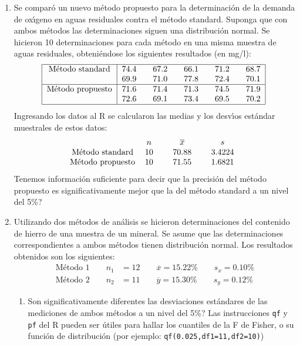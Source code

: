 \documentclass[11pt,a4paper,twoside]{article}%
\begin{document}
\begin{enumerate}
\item Se compar\'{o} un nuevo m\'{e}todo propuesto para la determinaci\'{o}n
de la demanda de ox\'{\i}geno en aguas residuales contra el m\'{e}todo
standard. Suponga que con ambos m\'{e}todos las determinaciones siguen una
distribuci\'{o}n normal. Se hicieron 10 determinaciones para cada m\'{e}todo
en una misma muestra de aguas residuales, obteni\'{e}ndose los siguientes
resultados (en mg/l):%
\[%
\begin{tabular}
[c]{|c|c|}\hline
M\'{e}todo standard & 74.4\qquad67.2\qquad66.1\qquad71.2\qquad68.7\\
& 69.9\qquad71.0\qquad77.8\qquad72.4\qquad70.1\\\hline
M\'{e}todo propuesto & 71.6\qquad71.4\qquad71.3\qquad74.5\qquad71.9\\
& 72.6\qquad69.1\qquad73.4\qquad69.5\qquad70.2\\\hline
\end{tabular}
\
\]
Ingresando los datos al R se calcularon las medias y los desv\'{\i}os
est\'{a}ndar muestrales de estos datos:%
\[%
\begin{tabular}
[c]{cccccc}
& $n$ &  & $\overline{x}$ &  & $s$\\
M\'{e}todo standard & 10 &  & 70.88 &  & 3.4224\\
M\'{e}todo propuesto & 10 &  & 71.55 &  & 1.6821
\end{tabular}
\ \
\]
\textquestiondown Tenemos informaci\'{o}n suficiente para decir que la
precisi\'{o}n del m\'{e}todo propuesto es significativamente mejor que la del
m\'{e}todo standard a un nivel del 5\%?

\item Utilizando dos m\'{e}todos de an\'{a}lisis se hicieron determinaciones
del contenido de hierro de una muestra de un mineral. Se asume que las
determinaciones correspondientes a ambos m\'{e}todos tienen distribuci\'{o}n
normal. Los resultados obtenidos son los siguientes:%
\begin{align*}
\text{M\'{e}todo 1}\qquad n_{1}  &  =12\qquad\overline{x}=15.22\%\qquad
s_{x}=0.10\%\\
\text{M\'{e}todo 2}\qquad n_{2}  &  =11\qquad\overline{y}=15.30\%\qquad
s_{y}=0.12\%
\end{align*}


\begin{enumerate}
\item \textquestiondown Son significativamente diferentes las desviaciones
est\'{a}ndares de las mediciones de ambos m\'{e}todos a un nivel del 5\%? Las
instrucciones \texttt{qf} y \texttt{pf} del R pueden ser \'{u}tiles para
hallar los cuantiles de la F de Fisher, o su funci\'{o}n de distribuci\'{o}n
(por ejemplo: \texttt{qf(0.025,df1=11,df2=10)})


\end{enumerate}
\end{enumerate}
\end{document}
